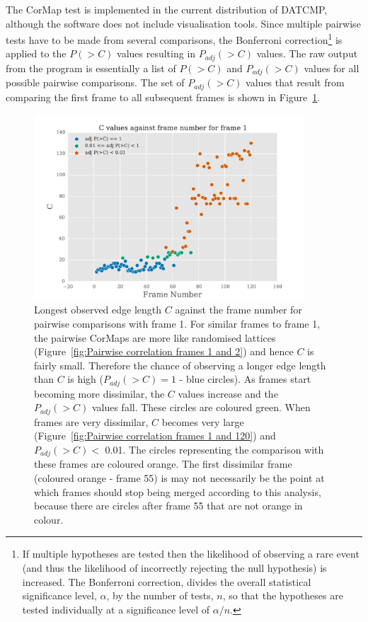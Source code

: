 The CorMap test is implemented in the current distribution of DATCMP, although the software does not include visualisation tools.
Since multiple pairwise tests have to be made from several comparisons, the Bonferroni correction\footnote{If multiple hypotheses are tested then the likelihood of observing a rare event (and thus the likelihood of incorrectly rejecting the null hypothesis) is increased. The Bonferroni correction, divides the overall statistical significance level, $\alpha$, by the number of tests, $n$, so that the hypotheses are tested individually at a significance level of $\alpha/n$.} is applied to the $P(>C)$ values resulting in $P_{adj}(>C)$ values.
The raw output from the program is essentially a list of $P(>C)$ and $P_{adj}(>C)$ values for all possible pairwise comparisons.
The set of $P_{adj}(>C)$ values that result from comparing the first frame to all subsequent frames is shown in Figure~\ref{fig:p values for comparisons with frame 1}.
\begin{figure}
    \centering
    \includegraphics[width=0.9\textwidth]{figures/saxs/scatter_asc_10.pdf}
    \caption[Longest observed edge length against the frame number for pairwise comparisons with frame 1.]{Longest observed edge length $C$ against the frame number for pairwise comparisons with frame 1.
    For similar frames to frame 1, the pairwise CorMaps are more like randomised lattices (Figure~\ref{fig:Pairwise correlation frames 1 and 2}) and hence $C$ is fairly small.
    Therefore the chance of observing a longer edge length than $C$ is high ($P_{adj}(>C) = 1$ - blue circles).
    As frames start becoming more dissimilar, the $C$ values increase and the $P_{adj}(>C)$ values fall.
    These circles are coloured green.
    When frames are very dissimilar, $C$ becomes very large (Figure~\ref{fig:Pairwise correlation frames 1 and 120}) and $P_{adj}(>C) <$ 0.01.
    The circles representing the comparison with these frames are coloured orange.
    The first dissimilar frame (coloured orange - frame 55) is may not necessarily be the point at which frames should stop being merged according to this analysis, because there are circles after frame 55 that are not orange in colour.}
    \label{fig:p values for comparisons with frame 1}
\end{figure}

